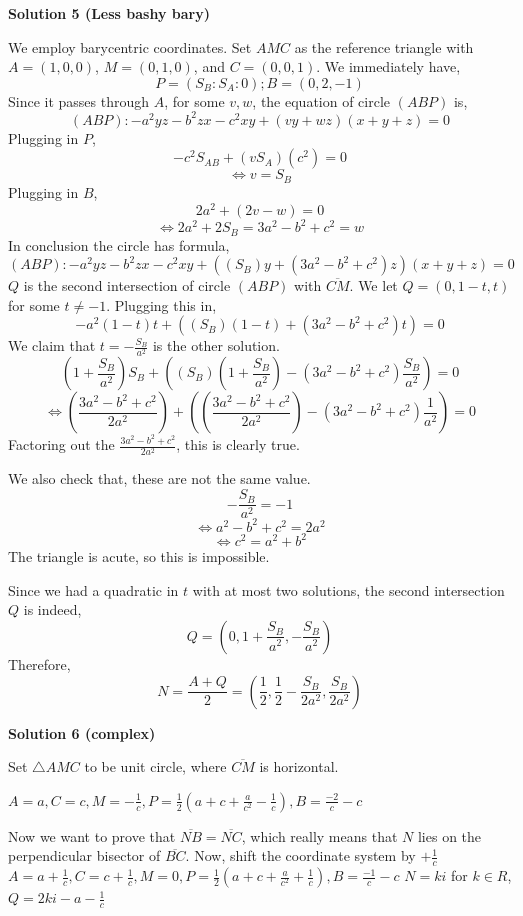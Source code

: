\begin{enumerate}
\textbf{Solution 5 (Less bashy bary)}

We employ barycentric coordinates. Set $AMC$ as the reference triangle with $A = (1, 0, 0)$, $M = (0, 1, 0)$, and $C = (0, 0, 1)$. We immediately have,
 \[P = (S_B : S_A : 0); B = (0, 2, -1)\]Since it passes through $A$, for some $v, w$, the equation of circle $(ABP)$ is,
 \[(ABP): -a^2 yz - b^2 zx - c^2 xy + (vy + wz)(x + y + z) = 0\]Plugging in $P$,
 \[- c^2 S_{AB} + (v S_A)(c^2) = 0\]
 \[\iff v = S_B\]Plugging in $B$,
 \[2a^2 + (2v - w) = 0\]
 \[\iff 2a^2 + 2 S_B = 3 a^2 - b^2 + c^2 = w\]In conclusion the circle has formula,
 \[(ABP): -a^2 yz - b^2 zx - c^2 xy + ((S_B)y + (3 a^2 - b^2 + c^2) z)(x + y + z) = 0\]$Q$ is the second intersection of circle $(ABP)$ with $\overline{CM}$. We let $Q = (0, 1 - t, t)$ for some $t \neq -1$. Plugging this in,
 \[-a^2 (1-t)t + ((S_B)(1-t) + (3 a^2 - b^2 + c^2) t) = 0\]We claim that $t = -\frac{S_B}{a^2}$ is the other solution. 
 \[\left(1+ \frac{S_B}{a^2} \right) S_B + \left((S_B)\left(1+ \frac{S_B}{a^2}\right) - (3 a^2 - b^2 + c^2) \frac{S_B}{a^2}\right) = 0\]
 \[\iff \left(\frac{3a^2 - b^2 + c^2}{2a^2} \right) + \left(\left(\frac{3a^2 - b^2 + c^2}{2a^2}\right) - (3 a^2 - b^2 + c^2) \frac{1}{a^2}\right) = 0\]Factoring out the $\frac{3a^2 - b^2 + c^2}{2a^2}$, this is clearly true.

 We also check that, these are not the same value.
 \[-\frac{S_B}{a^2} = -1\]
 \[\iff a^2 - b^2 + c^2 = 2a^2\]
 \[\iff c^2 = a^2 + b^2\]The triangle is acute, so this is impossible.

 Since we had a quadratic in $t$ with at most two solutions, the second intersection $Q$ is indeed,
 \[Q = \left( 0, 1 + \frac{S_B}{a^2}, -\frac{S_B}{a^2} \right)\]Therefore,
 \[N = \frac{A + Q}{2} = \left( \frac{1}{2}, \frac{1}{2} - \frac{S_B}{2a^2}, \frac{S_B}{2a^2} \right)\]




\textbf{Solution 6 (complex)}

Set $\triangle AMC$ to be unit circle, where $\overline{CM}$ is horizontal.

 $A=a, C=c, M=-\frac{1}{c}, P = \frac{1}{2}(a+c+\frac{a}{c^2}-\frac{1}{c}), B = \frac{-2}{c}-c$

 Now we want to prove that $\overline{NB}=\overline{NC}$, which really means that $N$ lies on the perpendicular bisector of $\overline{BC}$. Now, shift the coordinate system by $+\frac{1}{c}$
$A = a+\frac{1}{c}, C = c+\frac{1}{c}, M=0, P = \frac{1}{2}(a+c+\frac{a}{c^2}+\frac{1}{c}), B = \frac{-1}{c}-c$
$N=ki$ for $k\in R$, $Q=2ki-a-\frac{1}{c}$


\end{enumerate}
